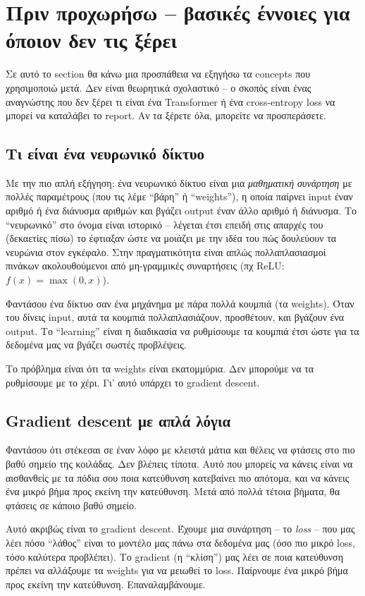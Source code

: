 \documentclass[12pt]{fphw}
\begin{document}
\section{Πριν προχωρήσω -- βασικές έννοιες για όποιον δεν τις ξέρει}

Σε αυτό το section θα κάνω μια προσπάθεια να εξηγήσω τα concepts που χρησιμοποιώ μετά. Δεν είναι θεωρητικά σχολαστικό -- ο σκοπός είναι ένας αναγνώστης που δεν ξέρει τι είναι ένα Transformer ή ένα cross-entropy loss να μπορεί να καταλάβει το report. Αν τα ξέρετε όλα, μπορείτε να προσπεράσετε.

\subsection{Τι είναι ένα νευρωνικό δίκτυο}

Με την πιο απλή εξήγηση: ένα νευρωνικό δίκτυο είναι μια \emph{μαθηματική συνάρτηση} με πολλές παραμέτρους (που τις λέμε ``βάρη'' ή ``weights''), η οποία παίρνει input έναν αριθμό ή ένα διάνυσμα αριθμών και βγάζει output έναν άλλο αριθμό ή διάνυσμα. Το ``νευρωνικό'' στο όνομα είναι ιστορικό -- λέγεται έτσι επειδή στις απαρχές του (δεκαετίες πίσω) το έφτιαξαν ώστε να μοιάζει με την ιδέα του πώς δουλεύουν τα νευρώνια στον εγκέφαλο. Στην πραγματικότητα είναι απλώς πολλαπλασιασμοί πινάκων ακολουθούμενοι από μη-γραμμικές συναρτήσεις (πχ ReLU: $f(x) = \max(0, x)$).

Φαντάσου ένα δίκτυο σαν ένα μηχάνημα με πάρα πολλά κουμπιά (τα weights). Όταν του δίνεις input, αυτά τα κουμπιά πολλαπλασιάζουν, προσθέτουν, και βγάζουν ένα output. Το ``learning'' είναι η διαδικασία να ρυθμίσουμε τα κουμπιά έτσι ώστε για τα δεδομένα μας να βγάζει σωστές προβλέψεις.

Το πρόβλημα είναι ότι τα weights είναι εκατομμύρια. Δεν μπορούμε να τα ρυθμίσουμε με το χέρι. Γι' αυτό υπάρχει το gradient descent.

\subsection{Gradient descent με απλά λόγια}

Φαντάσου ότι στέκεσαι σε έναν λόφο με κλειστά μάτια και θέλεις να φτάσεις στο πιο βαθύ σημείο της κοιλάδας. Δεν βλέπεις τίποτα. Αυτό που μπορείς να κάνεις είναι να αισθανθείς με τα πόδια σου ποια κατεύθυνση κατεβαίνει πιο απότομα, και να κάνεις ένα μικρό βήμα προς εκείνη την κατεύθυνση. Μετά από πολλά τέτοια βήματα, θα φτάσεις σε κάποιο βαθύ σημείο.

Αυτό ακριβώς είναι το gradient descent. Έχουμε μια συνάρτηση -- το \emph{loss} -- που μας λέει πόσο ``λάθος'' είναι το μοντέλο μας πάνω στα δεδομένα μας (όσο πιο μικρό loss, τόσο καλύτερα προβλέπει). Το gradient (η ``κλίση'') μας λέει σε ποια κατεύθυνση πρέπει να αλλάξουμε τα weights για να μειωθεί το loss. Παίρνουμε ένα μικρό βήμα προς εκείνη την κατεύθυνση. Επαναλαμβάνουμε.
\end{document}
